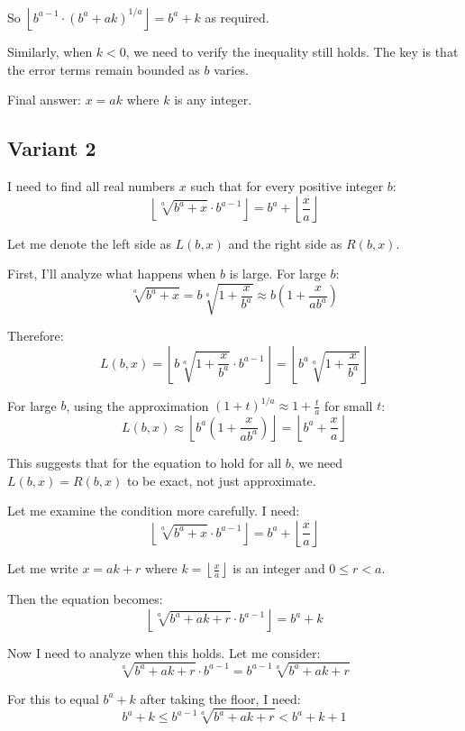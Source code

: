 \documentclass[12pt,a4paper]{article}
\theoremstyle{definition}
\begin{document}
    So $\left\lfloor b^{a-1} \cdot (b^a + ak)^{1/a} \right\rfloor = b^a + k$ as required.

    Similarly, when $k < 0$, we need to verify the inequality still holds. The key is that the error terms remain bounded as $b$ varies.

    Final answer: $x = ak$ where $k$ is any integer.
\subsection{Variant 2}
    I need to find all real numbers $x$ such that for every positive integer $b$:
    $$\left\lfloor \sqrt[a]{b^a + x} \cdot b^{a-1} \right\rfloor = b^a + \left\lfloor \frac{x}{a} \right\rfloor$$

    Let me denote the left side as $L(b,x)$ and the right side as $R(b,x)$.

    First, I'll analyze what happens when $b$ is large. For large $b$:
    $$\sqrt[a]{b^a + x} = b\sqrt[a]{1 + \frac{x}{b^a}} \approx b\left(1 + \frac{x}{ab^a}\right)$$

    Therefore:
    $$L(b,x) = \left\lfloor b\sqrt[a]{1 + \frac{x}{b^a}} \cdot b^{a-1} \right\rfloor = \left\lfloor b^a\sqrt[a]{1 + \frac{x}{b^a}} \right\rfloor$$

    For large $b$, using the approximation $(1+t)^{1/a} \approx 1 + \frac{t}{a}$ for small $t$:
    $$L(b,x) \approx \left\lfloor b^a\left(1 + \frac{x}{ab^a}\right) \right\rfloor = \left\lfloor b^a + \frac{x}{a} \right\rfloor$$

    This suggests that for the equation to hold for all $b$, we need $L(b,x) = R(b,x)$ to be exact, not just approximate.

    Let me examine the condition more carefully. I need:
    $$\left\lfloor \sqrt[a]{b^a + x} \cdot b^{a-1} \right\rfloor = b^a + \left\lfloor \frac{x}{a} \right\rfloor$$

    Let me write $x = ak + r$ where $k = \left\lfloor \frac{x}{a} \right\rfloor$ is an integer and $0 \leq r < a$.

    Then the equation becomes:
    $$\left\lfloor \sqrt[a]{b^a + ak + r} \cdot b^{a-1} \right\rfloor = b^a + k$$

    Now I need to analyze when this holds. Let me consider:
    $$\sqrt[a]{b^a + ak + r} \cdot b^{a-1} = b^{a-1}\sqrt[a]{b^a + ak + r}$$

    For this to equal $b^a + k$ after taking the floor, I need:
    $$b^a + k \leq b^{a-1}\sqrt[a]{b^a + ak + r} < b^a + k + 1$$
\end{document}
